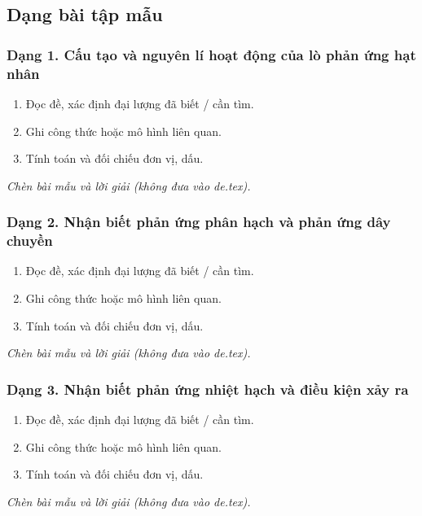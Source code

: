 

\subsection{Dạng bài tập mẫu}
\subsubsection{Dạng 1. Cấu tạo và nguyên lí hoạt động của lò phản ứng hạt nhân}
\begin{phuongphap}
\begin{enumerate}
\item Đọc đề, xác định đại lượng đã biết / cần tìm.
\item Ghi công thức hoặc mô hình liên quan.
\item Tính toán và đối chiếu đơn vị, dấu.
\end{enumerate}
\end{phuongphap}
\begin{vidumau}
\textit{Chèn bài mẫu và lời giải (không đưa vào de.tex).}
\end{vidumau}

\subsubsection{Dạng 2. Nhận biết phản ứng phân hạch và phản ứng dây chuyền}
\begin{phuongphap}
\begin{enumerate}
\item Đọc đề, xác định đại lượng đã biết / cần tìm.
\item Ghi công thức hoặc mô hình liên quan.
\item Tính toán và đối chiếu đơn vị, dấu.
\end{enumerate}
\end{phuongphap}
\begin{vidumau}
\textit{Chèn bài mẫu và lời giải (không đưa vào de.tex).}
\end{vidumau}

\subsubsection{Dạng 3. Nhận biết phản ứng nhiệt hạch và điều kiện xảy ra}
\begin{phuongphap}
\begin{enumerate}
\item Đọc đề, xác định đại lượng đã biết / cần tìm.
\item Ghi công thức hoặc mô hình liên quan.
\item Tính toán và đối chiếu đơn vị, dấu.
\end{enumerate}
\end{phuongphap}
\begin{vidumau}
\textit{Chèn bài mẫu và lời giải (không đưa vào de.tex).}
\end{vidumau}

